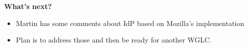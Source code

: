 \documentclass[helvetica]{seminar}
\newcommand{\heading}[1]{%
  \begin{center} 
    \large\bf 
    #1 
  \end{center} 
  \vspace{.4 in}}
\begin{document}
\begin{slide}
\heading{What's next?}

\begin{itemize}
\item Martin has some comments about IdP based on Mozilla's implementation
\item Plan is to address those and then be ready for another WGLC.
\end{itemize}

\end{slide}
\end{document}

